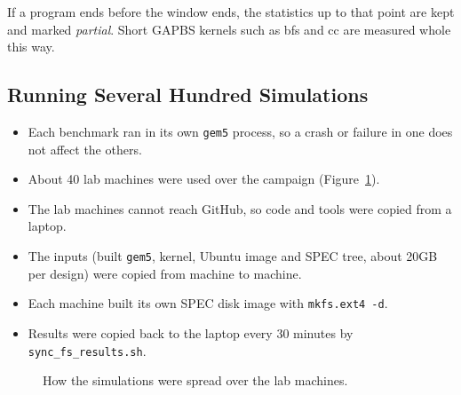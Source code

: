 If a program ends before the window ends, the statistics up to that point are kept and marked \emph{partial}. Short GAPBS kernels such as bfs and cc are measured whole this way.

\subsection{Running Several Hundred Simulations}
\begin{itemize}
    \item Each benchmark ran in its own \texttt{gem5} process, so a crash or failure in one does not affect the others.
    \item About 40 lab machines were used over the campaign (Figure~\ref{fig:infra}).
    \item The lab machines cannot reach GitHub, so code and tools were copied from a laptop.
    \item The inputs (built \texttt{gem5}, kernel, Ubuntu image and SPEC tree, about 20GB per design) were copied from machine to machine.
    \item Each machine built its own SPEC disk image with \texttt{mkfs.ext4 -d}.
    \item Results were copied back to the laptop every 30 minutes by \texttt{sync\_fs\_results.sh}.
\end{itemize}

\begin{figure}[htbp]
\centering
{}
\caption{How the simulations were spread over the lab machines.}
\label{fig:infra}
\end{figure}


